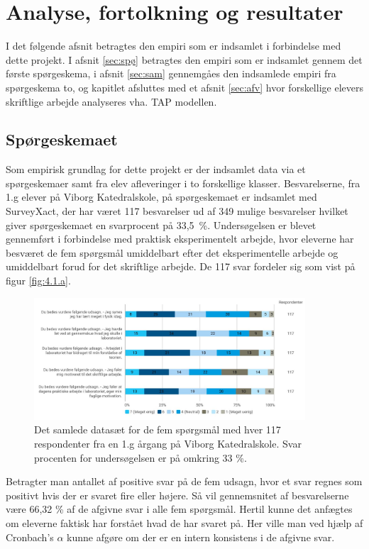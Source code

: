 \chapter{Analyse, fortolkning og resultater}
\label{Ch:4}

I det følgende afsnit betragtes den empiri som er indsamlet i forbindelse med dette projekt.  I afsnit \vref{sec:spø} betragtes den empiri som er indsamlet gennem det første spørgeskema, i afsnit \vref{sec:sam} gennemgåes den indsamlede empiri fra spørgeskema to, og kapitlet afsluttes med et afsnit \vref{sec:afv} hvor forskellige elevers skriftlige arbejde analyseres vha. TAP modellen.

\section{Spørgeskemaet}
\label{sec:spø}
Som empirisk grundlag for dette projekt er der indsamlet data via et spørgeskemaer samt fra elev afleveringer i to forskellige klasser. Besvarelserne, fra 1.g elever på Viborg Katedralskole, på spørgeskemaet er indsamlet med SurveyXact, der har været 117 besvarelser ud af 349 mulige besvarelser hvilket giver spørgeskemaet en svarprocent på \mbox{33,5 \%}. Undersøgelsen er blevet gennemført i forbindelse med praktisk eksperimentelt arbejde, hvor eleverne har besværet de fem spørgsmål umiddelbart efter det eksperimentelle arbejde og umiddelbart forud for det skriftlige arbejde. De 117 svar fordeler sig som vist på figur \vref{fig:4.1.a}. 

\begin{figure}[h!]
	\centering
	\includegraphics[width=0.9\textwidth]{Figs/Sammenlign}
	\caption{Det samlede datasæt for de fem spørgsmål med hver 117 respondenter fra en 1.g årgang på Viborg Katedralskole. Svar procenten for undersøgelsen er på omkring 33 \%. }
	\label{fig:4.1.a}
\end{figure}
Betragter man antallet af positive svar på de fem udsagn, hvor et svar regnes som positivt hvis der er svaret fire eller højere. Så vil gennemsnitet af besvarelserne være 66,32 \% af de afgivne svar i alle fem spørgsmål.  Hertil kunne det anfægtes om eleverne faktisk har forstået hvad de har svaret på. Her ville man ved hjælp af Cronbach's $\alpha$ kunne afgøre om der er en intern konsistens i de afgivne svar.

